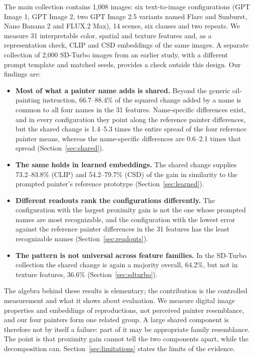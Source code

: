 \documentclass[10pt]{article}
\begin{document}
The main collection contains 1,008 images: six text-to-image configurations
(GPT Image 1, GPT Image 2, two GPT Image 2.5 variants named Flare and Sunburst,
Nano Banana 2 and FLUX.2 Max), 14 scenes, six clauses and two repeats. We measure
31 interpretable color, spatial and texture features and, as a representation
check, CLIP \citep{radford2021} and CSD \citep{somepalli2024style} embeddings of
the same images. A separate collection of 2,000 SD-Turbo images from an earlier
study, with a different prompt template and matched seeds, provides a check
outside this design. Our findings are:
\begin{itemize}
\item \textbf{Most of what a painter name adds is shared.} Beyond the generic
oil-painting instruction, 66.7--88.4\% of the squared change added by a name is
common to all four names in the 31 features. Name-specific differences exist, and
in every configuration they point along the reference painter differences, but the
shared change is 1.4--5.3 times the entire spread of the four reference painter
means, whereas the name-specific differences are 0.6--2.1 times that spread
(Section~\ref{sec:shared}).
\item \textbf{The same holds in learned embeddings.} The shared change supplies
73.2--83.8\% (CLIP) and 54.2--79.7\% (CSD) of the gain in similarity to the
prompted painter's reference prototype (Section~\ref{sec:learned}).
\item \textbf{Different readouts rank the configurations differently.} The
configuration with the largest proximity gain is not the one whose prompted names
are most recognizable, and the configuration with the lowest error against the
reference painter differences in the 31 features has the least recognizable names
(Section~\ref{sec:readouts}).
\item \textbf{The pattern is not universal across feature families.} In the
SD-Turbo collection the shared change is again a majority overall, 64.2\%, but not
in texture features, 36.6\% (Section~\ref{sec:sdturbo}).
\end{itemize}

The algebra behind these results is elementary; the contribution is the controlled
measurement and what it shows about evaluation. We measure digital image
properties and embeddings of reproductions, not perceived painter resemblance, and
our four painters form one related group. A large shared component is therefore
not by itself a failure: part of it may be appropriate family resemblance. The
point is that proximity gain cannot tell the two components apart, while the
decomposition can. Section~\ref{sec:limitations} states the limits of the evidence.
\end{document}
